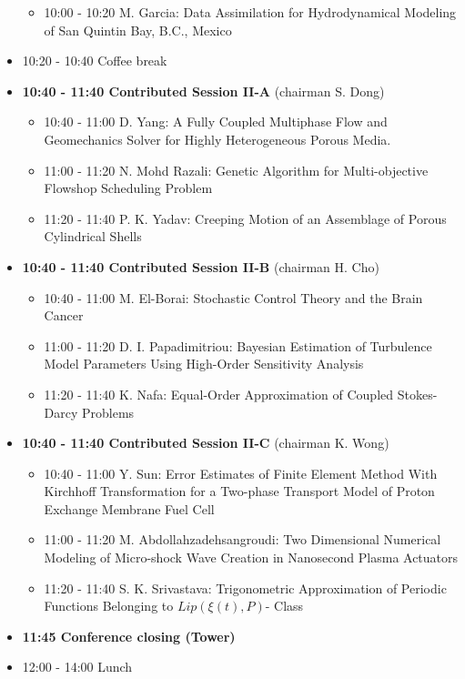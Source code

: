 \documentclass[10pt, A4]{article}%
\begin{document}
\begin{itemize}
\begin{itemize}
    \item 10:00 - 10:20 {M. Garcia}: {Data Assimilation for Hydrodynamical Modeling of San Quintin Bay, B.C., Mexico}
  \end{itemize}
  \item 10:20 - 10:40 Coffee break
  \item {\bf 10:40 - 11:40 Contributed Session II-A} (chairman S. Dong) 
  \begin{itemize}
    \item 10:40 - 11:00 {D. Yang}: {A Fully Coupled Multiphase Flow and Geomechanics Solver for Highly Heterogeneous Porous Media.} %
    \item 11:00 - 11:20 {N. Mohd Razali}: {Genetic Algorithm for Multi-objective Flowshop Scheduling Problem} %
    \item 11:20 - 11:40 {P. K. Yadav}: {Creeping Motion of an Assemblage of Porous Cylindrical Shells}
  \end{itemize}
  \item {\bf 10:40 - 11:40 Contributed Session II-B} (chairman H. Cho) 
  \begin{itemize}
    \item 10:40 - 11:00 {M. El-Borai}: {Stochastic Control Theory and the Brain Cancer}   
    \item 11:00 - 11:20 {D. I. Papadimitriou}: {Bayesian Estimation of Turbulence Model Parameters Using High-Order Sensitivity Analysis}
    \item 11:20 - 11:40 {K. Nafa}: {Equal-Order Approximation of Coupled Stokes-Darcy Problems}
  \end{itemize}
  \item {\bf 10:40 - 11:40 Contributed Session II-C} (chairman K. Wong) 
  \begin{itemize}
    \item 10:40 - 11:00 {Y. Sun}: Error Estimates of Finite Element Method With Kirchhoff Transformation for a Two-phase Transport Model of Proton Exchange Membrane Fuel Cell
    \item 11:00 - 11:20 {M. Abdollahzadehsangroudi}: {Two Dimensional Numerical Modeling of Micro-shock Wave Creation in Nanosecond Plasma Actuators}
    \item 11:20 - 11:40 {S. K. Srivastava}: {Trigonometric Approximation of Periodic Functions Belonging to $Lip(\xi(t), P)$- Class}
  \end{itemize}
  \item {\bf 11:45 Conference closing (Tower)}
  \item 12:00 - 14:00 Lunch
\newpage
\end{itemize}
\end{document}
